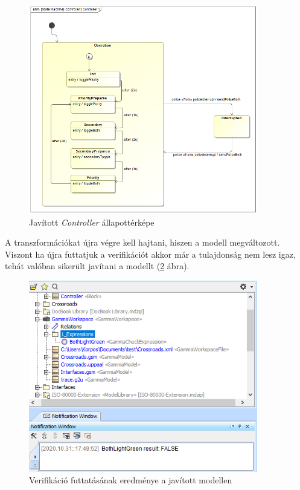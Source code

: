 \begin{figure}[!ht]
	\centering
	\includegraphics[width=10cm, keepaspectratio]{figures/contribution/ControllerFixed.png}
	\caption{Javított \emph{Controller} állapottérképe}
	\label{fig:fixed}
\end{figure}

A transzformációkat újra végre kell hajtani, hiszen a modell megváltozott. Viszont ha újra futtatjuk a verifikációt akkor már a tulajdonság nem lesz igaz, tehát valóban sikerült javítani a modellt (\ref{fig:verif2} ábra).

\begin{figure}[!ht]
	\centering
	\includegraphics[width=10cm, keepaspectratio]{figures/contribution/verif2.png}
	\caption{Verifikáció futtatásának eredménye a javított modellen}
	\label{fig:verif2}
\end{figure}